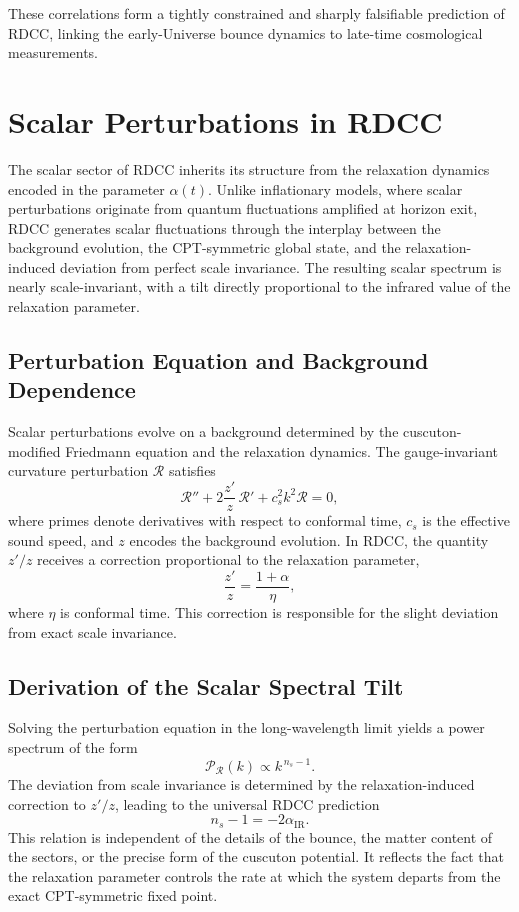 \documentclass[11pt,a4paper]{article}
\begin{document}
These correlations form a tightly constrained and sharply falsifiable prediction of
RDCC, linking the early-Universe bounce dynamics to late-time cosmological
measurements.

\section{Scalar Perturbations in RDCC}

The scalar sector of RDCC inherits its structure from the relaxation dynamics encoded
in the parameter $\alpha(t)$. Unlike inflationary models, where scalar perturbations
originate from quantum fluctuations amplified at horizon exit, RDCC generates scalar
fluctuations through the interplay between the background evolution, the CPT-symmetric
global state, and the relaxation-induced deviation from perfect scale invariance. The
resulting scalar spectrum is nearly scale-invariant, with a tilt directly proportional to
the infrared value of the relaxation parameter.

\subsection{Perturbation Equation and Background Dependence}

Scalar perturbations evolve on a background determined by the cuscuton-modified
Friedmann equation and the relaxation dynamics. The gauge-invariant curvature
perturbation $\mathcal{R}$ satisfies
\begin{equation}
    \mathcal{R}'' + 2\frac{z'}{z}\,\mathcal{R}' + c_s^2 k^2 \mathcal{R} = 0,
\end{equation}
where primes denote derivatives with respect to conformal time, $c_s$ is the effective
sound speed, and $z$ encodes the background evolution. In RDCC, the quantity $z'/z$
receives a correction proportional to the relaxation parameter,
\begin{equation}
    \frac{z'}{z}
    = \frac{1+\alpha}{\eta},
\end{equation}
where $\eta$ is conformal time. This correction is responsible for the slight deviation
from exact scale invariance.

\subsection{Derivation of the Scalar Spectral Tilt}

Solving the perturbation equation in the long-wavelength limit yields a power spectrum
of the form
\begin{equation}
    \mathcal{P}_{\mathcal{R}}(k) \propto k^{\,n_s - 1}.
\end{equation}
The deviation from scale invariance is determined by the relaxation-induced correction
to $z'/z$, leading to the universal RDCC prediction
\begin{equation}
    n_s - 1 = -2\alpha_{\mathrm{IR}}.
\end{equation}
This relation is independent of the details of the bounce, the matter content of the
sectors, or the precise form of the cuscuton potential. It reflects the fact that the
relaxation parameter controls the rate at which the system departs from the exact
CPT-symmetric fixed point.
\end{document}
